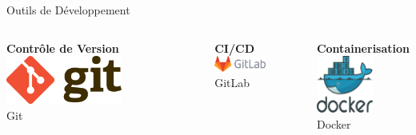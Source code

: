 \documentclass[aspectratio=169]{beamer}
\begin{document}
\begin{frame}{Outils de Développement}
    \begin{columns}
        \begin{center}
            \textbf{Contrôle de Version}\\[0.5cm]
            \includegraphics[width=0.6\textwidth]{latex_media/media/git.png}\\
            \small Git
        \end{center}

        \begin{center}
            \textbf{CI/CD}\\[0.5cm]
            \includegraphics[width=0.6\textwidth]{latex_media/media/gitlab.png}\\
            \small GitLab
        \end{center}

        \begin{center}
            \textbf{Containerisation}\\[0.5cm]
            \includegraphics[width=0.6\textwidth]{latex_media/media/docker.png}\\
            \small Docker
        \end{center}
    \end{columns}


\end{frame}
\end{document}
